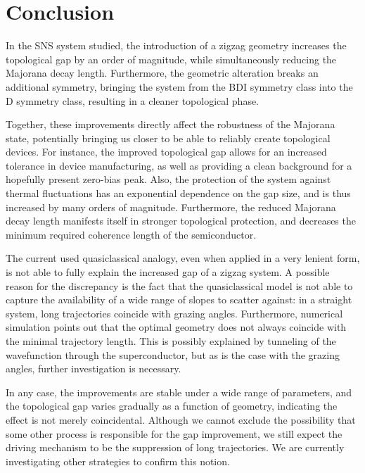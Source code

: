 \chapter{Conclusion}\label{chap:conclusion}
In the SNS system studied, the introduction of a zigzag geometry increases the topological gap by an order of magnitude, while simultaneously reducing the Majorana decay length.
Furthermore, the geometric alteration breaks an additional symmetry, bringing the system from the BDI symmetry class into the D symmetry class, resulting in a cleaner topological phase.

Together, these improvements directly affect the robustness of the Majorana state, potentially bringing us closer to be able to reliably create topological devices.
For instance, the improved topological gap allows for an increased tolerance in device manufacturing, as well as providing a clean background for a hopefully present zero-bias peak.
Also, the protection of the system against thermal fluctuations has an exponential dependence on the gap size, and is thus increased by many orders of magnitude.
Furthermore, the reduced Majorana decay length manifests itself in stronger topological protection, and decreases the minimum required coherence length of the semiconductor.

The current used quasiclassical analogy, even when applied in a very lenient form, is not able to fully explain the increased gap of a zigzag system.
A possible reason for the discrepancy is the fact that the quasiclassical model is not able to capture the availability of a wide range of slopes to scatter against: in a straight system, long trajectories coincide with grazing angles.
Furthermore, numerical simulation points out that the optimal geometry does not always coincide with the minimal trajectory length.
This is possibly explained by tunneling of the wavefunction through the superconductor, but as is the case with the grazing angles, further investigation is necessary.

In any case, the improvements are stable under a wide range of parameters, and the topological gap varies gradually as a function of geometry, indicating the effect is not merely coincidental.
Although we cannot exclude the possibility that some other process is responsible for the gap improvement, we still expect the driving mechanism to be the suppression of long trajectories.
We are currently investigating other strategies to confirm this notion.


